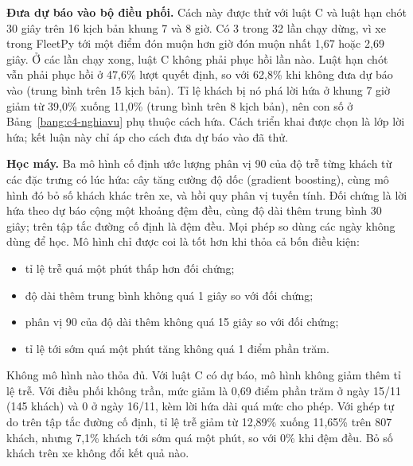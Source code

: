 \textbf{Đưa dự báo vào bộ điều phối.} Cách này được thử với luật C và luật hạn chót 30 giây trên 16 kịch bản khung 7
và 8 giờ. Có 3 trong 32 lần chạy dừng, vì xe trong FleetPy tới một điểm đón muộn hơn giờ đón muộn nhất 1,67 hoặc
2,69 giây. Ở các lần chạy xong, luật C không phải phục hồi lần nào. Luật hạn chót vẫn phải phục hồi ở 47,6\% lượt
quyết định, so với 62,8\% khi không đưa dự báo vào (trung bình trên 15 kịch bản). Tỉ lệ khách bị nó phá lời hứa ở
khung 7 giờ giảm từ 39,0\% xuống 11,0\% (trung bình trên 8 kịch bản), nên con số ở Bảng~\ref{bang:c4-nghiavu} phụ
thuộc cách hứa. Cách triển khai được chọn là lớp lời hứa; kết luận này chỉ áp cho cách đưa dự báo vào đã thử.

\textbf{Học máy.} Ba mô hình cố định ước lượng phân vị 90 của độ trễ từng khách từ các đặc trưng có lúc hứa: cây
tăng cường độ dốc (gradient boosting), cùng mô hình đó bỏ số khách khác trên xe, và hồi quy phân vị tuyến tính. Đối
chứng là lời hứa theo dự báo cộng một khoảng đệm đều, cùng độ dài thêm trung bình 30 giây; trên tập tắc đường cố định
là đệm đều. Mọi phép so dùng các ngày không dùng để học. Mô hình chỉ được coi là tốt hơn khi thỏa cả bốn điều kiện:
\begin{itemize}[leftmargin=1.2cm,itemsep=0pt,topsep=2pt]
\item tỉ lệ trễ quá một phút thấp hơn đối chứng;
\item độ dài thêm trung bình không quá 1 giây so với đối chứng;
\item phân vị 90 của độ dài thêm không quá 15 giây so với đối chứng;
\item tỉ lệ tới sớm quá một phút tăng không quá 1 điểm phần trăm.
\end{itemize}

Không mô hình nào thỏa đủ. Với luật C có dự báo, mô hình không giảm thêm tỉ lệ trễ. Với điều phối không trần, mức
giảm là 0,69 điểm phần trăm ở ngày 15/11 (145 khách) và 0 ở ngày 16/11, kèm lời hứa dài quá mức cho phép. Với ghép
tự do trên tập tắc đường cố định, tỉ lệ trễ giảm từ 12,89\% xuống 11,65\% trên 807 khách, nhưng 7,1\% khách tới sớm
quá một phút, so với 0\% khi đệm đều. Bỏ số khách trên xe không đổi kết quả nào.

